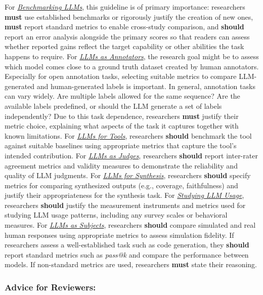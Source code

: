 \documentclass[smallextended]{svjour3}
\newcommand{\must}{\textbf{must}\xspace}
\newcommand{\should}{\textbf{should}\xspace}
\newcommand{\annotators}{\hyperref[sec:llms-as-annotators]{\emph{LLMs as Annotators}}\xspace}
\newcommand{\judges}{\hyperref[sec:llms-as-judges]{\emph{LLMs as Judges}}\xspace}
\newcommand{\synthesis}{\hyperref[sec:llms-for-synthesis]{\emph{LLMs for Synthesis}}\xspace}
\newcommand{\subjects}{\hyperref[sec:llms-as-subjects]{\emph{LLMs as Subjects}}\xspace}
\newcommand{\llmusage}{\hyperref[sec:studying-llm-usage-in-software-engineering]{\emph{Studying LLM Usage}}\xspace}
\newcommand{\newtools}{\hyperref[sec:llms-for-new-software-engineering-tools]{\emph{LLMs for Tools}}\xspace}
\newcommand{\benchmarkingtasks}{\hyperref[sec:benchmarking-llms-for-software-engineering-tasks]{\emph{Benchmarking LLMs}}\xspace}
\newcommand{\annotators}{\href{/study-types\#llms-as-annotators}{\emph{LLMs as Annotators}}\xspace}
\newcommand{\judges}{\href{/study-types\#llms-as-judges}{\emph{LLMs as Judges}}\xspace}
\newcommand{\synthesis}{\href{/study-types\#llms-for-synthesis}{\emph{LLMs for Synthesis}}\xspace}
\newcommand{\subjects}{\href{/study-types\#llms-as-subjects}{\emph{LLMs as Subjects}}\xspace}
\newcommand{\llmusage}{\href{/study-types\#studying-llm-usage-in-software-engineering}{\emph{Studying LLM Usage}}\xspace}
\newcommand{\newtools}{\href{/study-types\#llms-for-new-software-engineering-tools}{\emph{LLMs for Tools}}\xspace}
\newcommand{\benchmarkingtasks}{\href{/study-types\#benchmarking-llms-for-software-engineering-tasks}{\emph{Benchmarking LLMs}}\xspace}
\newcommand{\guidelinesubsubsection}[1]{\subsubsection{\bfseries #1:}}
\newcommand{\guidelinesubsubsection}[1]{\subsubsection{#1}}
\begin{document}
For \benchmarkingtasks, this guideline is of primary importance: researchers \must use established benchmarks or rigorously justify the creation of new ones, \must report standard metrics to enable cross-study comparison, and \should report an error analysis alongside the primary scores so that readers can assess whether reported gains reflect the target capability or other abilities the task happens to require.
For \annotators, the research goal might be to assess which model comes close to a ground truth dataset created by human annotators.
Especially for open annotation tasks, selecting suitable metrics to compare LLM-generated and human-generated labels is important.
In general, annotation tasks can vary widely.
Are multiple labels allowed for the same sequence? Are the available labels predefined, or should the LLM generate a set of labels independently?
Due to this task dependence, researchers \must justify their metric choice, explaining what aspects of the task it captures together with known limitations.
For \newtools, researchers \should benchmark the tool against suitable baselines using appropriate metrics that capture the tool's intended contribution.
For \judges, researchers \should report inter-rater agreement metrics and validity measures to demonstrate the reliability and quality of LLM judgments.
For \synthesis, researchers \should specify metrics for comparing synthesized outputs (e.g., coverage, faithfulness) and justify their appropriateness for the synthesis task.
For \llmusage, researchers \should justify the measurement instruments and metrics used for studying LLM usage patterns, including any survey scales or behavioral measures.
For \subjects, researchers \should compare simulated and real human responses using appropriate metrics to assess simulation fidelity.
If researchers assess a well-established task such as code generation, they \should report standard metrics such as \emph{pass@k} and compare the performance between models.
If non-standard metrics are used, researchers \must state their reasoning.

\guidelinesubsubsection{Advice for Reviewers}
\end{document}
